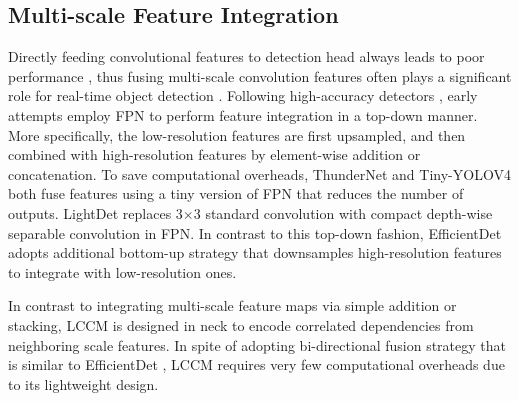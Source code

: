 \documentclass[lettersize,journal]{IEEEtran}
\begin{document}
\subsection{Multi-scale Feature Integration}

Directly feeding convolutional features to detection head always leads to poor performance \cite{Pelee,howard2017mobilenets,sandler2018mobilenetv2}, thus fusing multi-scale convolution features often plays a significant role for real-time object detection \cite{li2018tiny,redmon2017yolo9000,redmon2018yolov3}. Following high-accuracy detectors \cite{lin2017feature,liu2018path}, early attempts \cite{li2018tiny,qin2019thundernet,tang2020lightdet} employ FPN to perform feature integration in a top-down manner. More specifically, the low-resolution features are first upsampled, and then combined with high-resolution features by element-wise addition or concatenation. To save computational overheads, ThunderNet \cite{qin2019thundernet} and Tiny-YOLOV4 \cite{wang2021scaled} both fuse features using a tiny version of FPN that reduces the number of outputs. LightDet \cite{tang2020lightdet} replaces 3$\times$3 standard convolution with compact depth-wise separable convolution in FPN. In contrast to this top-down fashion, EfficientDet \cite{tan2020efficientdet} adopts additional bottom-up strategy that downsamples high-resolution features to integrate with low-resolution ones. 





In contrast to integrating multi-scale feature maps via simple addition or stacking, LCCM is designed in neck to encode correlated dependencies from neighboring scale features. In spite of adopting bi-directional fusion strategy that is similar to EfficientDet \cite{tan2020efficientdet}, LCCM requires very few computational overheads due to its lightweight design. 
\end{document}
